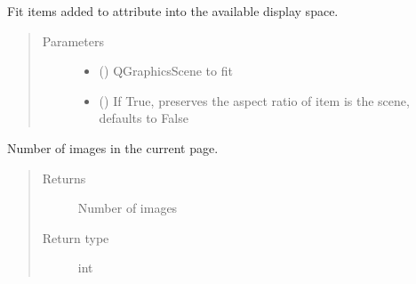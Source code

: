 \documentclass[letterpaper,10pt,english]{sphinxmanual}
\begin{document}
\begin{fulllineitems}

\begin{fulllineitems}
\label{\detokenize{polo.widgets:polo.widgets.plate_viewer.plateViewer.fitInView}}
Fit items added to  attribute into the available
display space.
\begin{quote}\begin{description}
\item[{Parameters}] \leavevmode\begin{itemize}
\item {} 
 () \textendash{} QGraphicsScene to fit

\item {} 
 (\sphinxstyleliteralemphasis{\sphinxupquote{, }}) \textendash{} If True, preserves the aspect ratio of
item is the scene, defaults to False

\end{itemize}

\end{description}\end{quote}

\end{fulllineitems}


\begin{fulllineitems}
\label{\detokenize{polo.widgets:polo.widgets.plate_viewer.plateViewer.images_per_page}}
Number of images in the current page.
\begin{quote}\begin{description}
\item[{Returns}] \leavevmode
Number of images

\item[{Return type}] \leavevmode
int


\end{description}
\end{quote}
\end{fulllineitems}
\end{fulllineitems}
\end{document}
